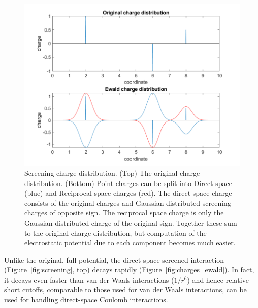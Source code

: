 \documentclass[9pt,bestpractices]{livecoms}
\begin{document}
\begin{figure}[h]
\centering
\includegraphics[width=\linewidth]{ewald.pdf}

    \caption{\label{fig:screening}Screening charge distribution. (Top) The original charge distribution. (Bottom) Point charges can be split into Direct space (blue) and Reciprocal space charges (red). The direct space charge consists of the original charges and Gaussian-distributed screening charges of opposite sign. The reciprocal space charge is only the Gaussian-distributed charge of the original sign. Together these sum to the original charge distribution, but computation of the electrostatic potential due to each component becomes much easier.}
\label{charges_ewald}
\end{figure}

Unlike the original, full potential, the direct space screened interaction (Figure~\ref{fig:screening}, top) decays rapidly (Figure~\ref{fig:charges_ewald}).
In fact, it decays even faster than van der Waals interactions ($1/r^{6}$) and hence relative short cutoffs, comparable to those used for van der Waals interactions, can be used for handling direct-space Coulomb interactions.
\end{document}

